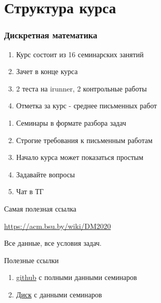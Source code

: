 \documentclass[10pt]{beamer}
\theoremstyle{remark}
\theoremstyle{definition}
\begin{document}
\section{Структура курса}
\begin{frame}[allowframebreaks]
\frametitle{Дискретная математика}

\begin{enumerate}
    \item Курс состоит из 16 семинарских занятий
    \item Зачет в конце курса
    \item 2 теста на irunner, 2 контрольные работы 
    \item Отметка за курс - среднее письменных работ
\end{enumerate}

\framebreak

\begin{enumerate}
    \item Семинары в формате разбора задач
    \item Строгие требования к письменным работам
    \item Начало курса может показаться простым
    \item Задавайте вопросы
    \item Чат в ТГ

\end{enumerate}

\framebreak 

Самая полезная ссылка

\href{https://acm.bsu.by/wiki/DM2020}{https://acm.bsu.by/wiki/DM2020}

Все данные, все условия задач.

Полезные ссылки 
\begin{enumerate}
    \item \href{https://github.com/Anastasiya-Zhyrkevich/DiscreteMath-solutions}{github} с полными данными семинаров
    \item \href{https://drive.google.com/drive/folders/1LO6ifRf9qDqoghwRaMIpPo1crvZeAjjn?usp=sharing}{Диск} с данными семинаров
\end{enumerate}

\framebreak

\end{frame}
\end{document}
